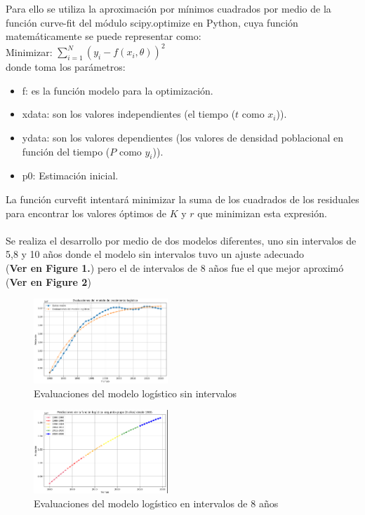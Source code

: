 \documentclass[a4paper,10pt,twocolumn]{article}
\begin{document}
	Para ello se utiliza la aproximación por mínimos cuadrados por medio de la función curve-fit del módulo scipy.optimize en Python, cuya función matemáticamente se puede representar como:\\
	Minimizar: $\sum_{i=1}^{N} (y_{i} - f(x_{i}, \theta))^{2} $ \\
	donde toma los parámetros:
	\begin{itemize}
		\item f: es la función modelo para la optimización.
		\item xdata: son los valores independientes (el tiempo ($t$ como $x_{i}$)).
		\item ydata: son los valores dependientes (los valores de densidad poblacional en función del tiempo ($P$ como $y_{i}$)).
		\item p0: Estimación inicial.
	\end{itemize}
	\small{La función curvefit intentará minimizar la suma de los cuadrados de los residuales para encontrar los valores óptimos de $K$ y $r$ que minimizan esta expresión.} \\\\	
	Se realiza el desarrollo por medio de dos modelos diferentes, uno sin intervalos de 5,8 y 10 años donde el modelo sin intervalos tuvo un ajuste adecuado \\(\textbf{Ver en Figure 1.}) pero el de intervalos de 8 años fue el que mejor aproximó (\textbf{Ver en Figure 2})  
	\begin{figure}[h!]%
		\begin{center}
			\includegraphics[width=0.45\textwidth]{real_vs_pred.png}
			\caption{Evaluaciones del modelo logístico sin intervalos\label{fig:ex}}
		\end{center}
	\end{figure}

	\begin{figure}[h!]%
		\begin{center}
			\includegraphics[width=0.45\textwidth]{prediccion.png}
			\caption{Evaluaciones del modelo logístico en intervalos de 8 años\label{fig:ex}}
		\end{center}
	\end{figure}
\end{document}
